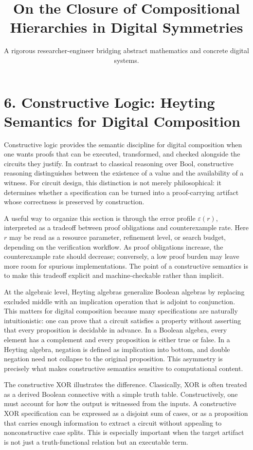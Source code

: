 \documentclass[11pt]{article}
\title{On the Closure of Compositional Hierarchies in Digital Symmetries}
\author{A rigorous researcher-engineer bridging abstract mathematics and concrete digital systems.}
\begin{document}
\section*{6. Constructive Logic: Heyting Semantics for Digital Composition}

Constructive logic provides the semantic discipline for digital composition when one wants proofs that can be executed, transformed, and checked alongside the circuits they justify. In contrast to classical reasoning over \(\mathrm{Bool}\), constructive reasoning distinguishes between the existence of a value and the availability of a witness. For circuit design, this distinction is not merely philosophical: it determines whether a specification can be turned into a proof-carrying artifact whose correctness is preserved by construction.

A useful way to organize this section is through the error profile \(\varepsilon(r)\), interpreted as a tradeoff between proof obligations and counterexample rate. Here \(r\) may be read as a resource parameter, refinement level, or search budget, depending on the verification workflow. As proof obligations increase, the counterexample rate should decrease; conversely, a low proof burden may leave more room for spurious implementations. The point of a constructive semantics is to make this tradeoff explicit and machine-checkable rather than implicit.

At the algebraic level, Heyting algebras generalize Boolean algebras by replacing excluded middle with an implication operation that is adjoint to conjunction. This matters for digital composition because many specifications are naturally intuitionistic: one can prove that a circuit satisfies a property without asserting that every proposition is decidable in advance. In a Boolean algebra, every element has a complement and every proposition is either true or false. In a Heyting algebra, negation is defined as implication into bottom, and double negation need not collapse to the original proposition. This asymmetry is precisely what makes constructive semantics sensitive to computational content.

The constructive XOR illustrates the difference. Classically, XOR is often treated as a derived Boolean connective with a simple truth table. Constructively, one must account for how the output is witnessed from the inputs. A constructive XOR specification can be expressed as a disjoint sum of cases, or as a proposition that carries enough information to extract a circuit without appealing to nonconstructive case splits. This is especially important when the target artifact is not just a truth-functional relation but an executable term.
\end{document}
